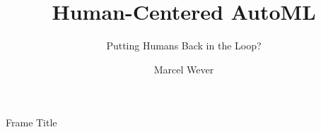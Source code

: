 \documentclass[main]{subfiles}
\title[Human-Centered AutoML]{Human-Centered AutoML}
\subtitle{Putting Humans Back in the Loop?}
\author[Marcel Wever]{Marcel Wever}
\date{}
\begin{document}
	
	\maketitle


\begin{frame}{Frame Title}
    
\end{frame}
\end{document}
